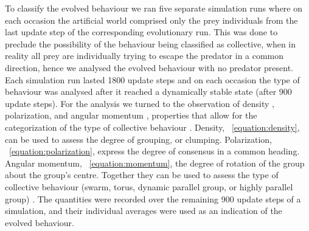 To classify the evolved behaviour we ran five separate simulation runs where on each occasion the artificial world comprised only the prey individuals from the last update step of the corresponding evolutionary run. This was done to preclude the possibility of the behaviour being classified as collective, when in reality all prey are individually trying to escape the predator in a common direction, hence we analysed the evolved behaviour with no predator present. Each simulation run lasted 1800 update steps and on each occasion the type of behaviour was analysed after it reached a dynamically stable state (\ie after 900 update steps). For the analysis we turned to the observation of density \cite{olson2016evolution}, polarization, and angular momentum \cite{couzin2002collective}, properties that allow for the categorization of the type of collective behaviour \cite{couzin2002collective,olson2016evolution,tunstrom2013collective,vicsek2012collective,wood2007evolving}. Density, \eq~\eqref{equation:density}, can be used to assess the degree of grouping, or clumping. Polarization, \eq~\eqref{equation:polarization}, express the degree of consensus in a common heading. Angular momentum, \eq~\eqref{equation:momentum}, the degree of rotation of the group about the group's centre. Together they can be used to assess the type of collective behaviour (\ie swarm, torus, dynamic parallel group, or highly parallel group) \cite{couzin2002collective}. The quantities were recorded over the remaining 900 update steps of a simulation, and their individual averages were used as an indication of the evolved behaviour.

